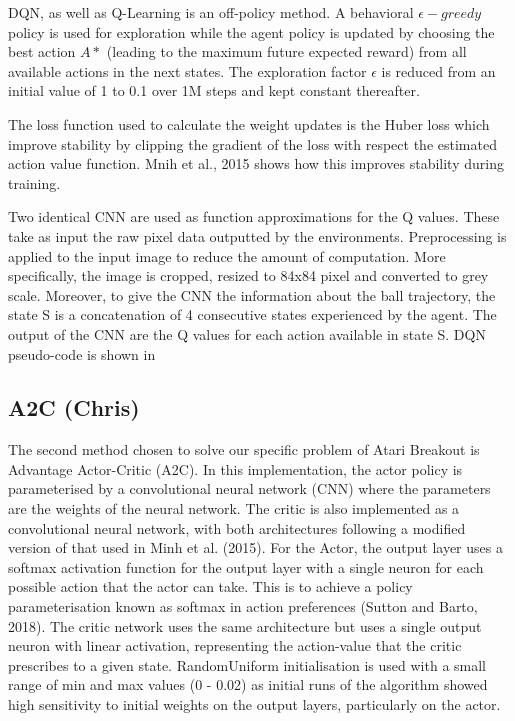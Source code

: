 \documentclass{article}
\begin{document}
DQN, as well as Q-Learning is an off-policy method. A behavioral $\epsilon-greedy$ policy is used for exploration while the agent policy is updated by choosing the best action $A*$ (leading to the maximum future expected reward) from all available actions in the next states.
The exploration factor $\epsilon$ is reduced from an initial value of 1 to 0.1 over 1M steps and kept constant thereafter.

The loss function used to calculate the weight updates is the Huber loss which improve stability by clipping the gradient of the loss with respect the estimated action value function. Mnih et al., 2015 shows how this improves stability during training.

Two identical CNN are used as function approximations for the Q values. These take as input the raw pixel data outputted by the environments. Preprocessing is applied to the input image to reduce the amount of computation. More specifically, the image is cropped, resized to 84x84 pixel and converted to grey scale. Moreover, to give the CNN the information about the ball trajectory, the state S is a concatenation of 4 consecutive states experienced by the agent. The output of the CNN are the Q values for each action available in state S.
DQN pseudo-code is shown in 

\subsection{A2C (Chris)}

The second method chosen to solve our specific problem of Atari Breakout is Advantage Actor-Critic (A2C). In this implementation, the actor policy is parameterised by a convolutional neural network (CNN) where the parameters are the weights of the neural network. The critic is also implemented as a convolutional neural network, with both architectures following a modified version of that used in Minh et al. (2015). For the Actor, the output layer uses a softmax activation function for the output layer with a single neuron for each possible action that the actor can take. This is to achieve a policy parameterisation known as softmax in action preferences (Sutton and Barto, 2018). The critic network uses the same architecture but uses a single output neuron with linear activation, representing the action-value that the critic prescribes to a given state. RandomUniform initialisation is used with a small range of min and max values (0 - 0.02) as initial runs of the algorithm showed high sensitivity to initial weights on the output layers, particularly on the actor.
\end{document}
